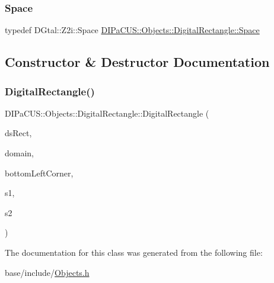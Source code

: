 \mbox{\label{classDIPaCUS_1_1Objects_1_1DigitalRectangle_a26a6e7843d9e9c0d7c6ff1e3d999a176}} 
\subsubsection{\texorpdfstring{Space}{Space}}
{\footnotesize\ttfamily typedef D\+Gtal\+::\+Z2i\+::\+Space \mbox{\hyperlink{classDIPaCUS_1_1Objects_1_1DigitalRectangle_a26a6e7843d9e9c0d7c6ff1e3d999a176}{D\+I\+Pa\+C\+U\+S\+::\+Objects\+::\+Digital\+Rectangle\+::\+Space}}}



\subsection{Constructor \& Destructor Documentation}
\mbox{\label{classDIPaCUS_1_1Objects_1_1DigitalRectangle_a6e2de8d8313dc9d41ac443ebce94767b}} 
\subsubsection{\texorpdfstring{Digital\+Rectangle()}{DigitalRectangle()}}
{\footnotesize\ttfamily D\+I\+Pa\+C\+U\+S\+::\+Objects\+::\+Digital\+Rectangle\+::\+Digital\+Rectangle (\begin{DoxyParamCaption}\item[{\mbox{\hyperlink{classDIPaCUS_1_1Objects_1_1DigitalRectangle_aa277152d51e6e767b4d294dc79b20474}{Digital\+Set}} \&}]{ds\+Rect,  }\item[{\mbox{\hyperlink{classDIPaCUS_1_1Objects_1_1DigitalRectangle_add1c406f48895527e219cdf6814f6846}{Domain}}}]{domain,  }\item[{\mbox{\hyperlink{classDIPaCUS_1_1Objects_1_1DigitalRectangle_ac1d9c58863735da9ed1cdf19883ac6bb}{Point}}}]{bottom\+Left\+Corner,  }\item[{unsigned int}]{s1,  }\item[{unsigned int}]{s2 }\end{DoxyParamCaption})\hspace{0.3cm}{\ttfamily [inline]}}



The documentation for this class was generated from the following file\+:\begin{DoxyCompactItemize}
\item 
base/include/\mbox{\hyperlink{Objects_8h}{Objects.\+h}}\end{DoxyCompactItemize}

